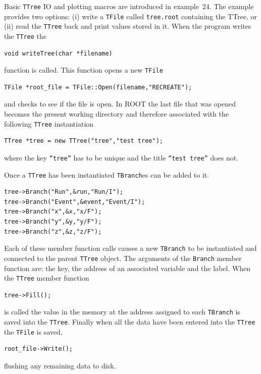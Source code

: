 \documentclass[11pt,a4paper]{scrartcl}
\begin{document}
Basic \texttt{TTree} IO and plotting macros are introduced in
example~24.  The example provides two options: (i) write a
\texttt{TFile} called \texttt{tree.root} containing the TTree, or (ii)
read the \texttt{TTree} back and print values stored in it.  When the program writes the \texttt{TTree} the
\begin{verbatim}
void writeTree(char *filename)
\end{verbatim}
function is called.  This function opens a new \texttt{TFile}
\begin{verbatim}
TFile *root_file = TFile::Open(filename,"RECREATE");
\end{verbatim}
and checks to see if the file is open.  In ROOT the last file that was
opened becomes the present working directory and therefore associated with the following \texttt{TTree} instantiation
\begin{verbatim}
TTree *tree = new TTree("tree","test tree");
\end{verbatim}
where the key \texttt{``tree''} has to be unique and the title \texttt{``test tree''} does not.

Once a \texttt{TTree} has been instantiated \texttt{TBranch}es can be added to it.
\begin{verbatim}
tree->Branch("Run",&run,"Run/I");
tree->Branch("Event",&event,"Event/I");
tree->Branch("x",&x,"x/F");
tree->Branch("y",&y,"y/F");
tree->Branch("z",&z,"z/F");
\end{verbatim}
Each of these member function calls
causes a new \texttt{TBranch} to be instantiated and connected to the
parent \texttt{TTree} object.  The arguments of the \texttt{Branch} member
function are: the key, the address of an associated variable and the
label.  When the \texttt{TTree} member function 
%
\begin{verbatim}
tree->Fill();
\end{verbatim}
%
is called the value in the memory at the address assigned to each
\texttt{TBranch} is saved into the \texttt{TTree}.  Finally when all
the data have been entered into the \texttt{TTree} the \texttt{TFile}
is saved,
% 
\begin{verbatim}
root_file->Write();
\end{verbatim}
%
flushing any remaining data to disk.
\end{document}
